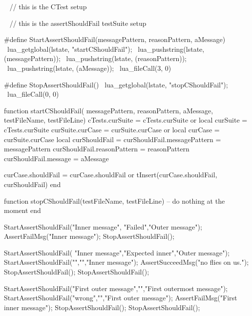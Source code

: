 \CTestsSetup\
\startCTest
  // this is the CTest setup
\stopCTest


\CTestSuiteSetup\
\startCTest
  // this is the assertShouldFail testSuite setup
\stopCTest

\startCHeader
#define StartAssertShouldFail(messagePattern, reasonPattern, aMessage) \
  lua_getglobal(lstate, "startCShouldFail");                           \
  lua_pushstring(lstate, (messagePattern));                            \
  lua_pushstring(lstate, (reasonPattern));                             \
  lua_pushstring(lstate, (aMessage));                                  \
  lua_fileCall(3, 0)

#define StopAssertShouldFail()              \
  lua_getglobal(lstate, "stopCShouldFail"); \
  lua_fileCall(0, 0)
\stopCHeader

\startLuaCode
function startCShouldFail(
  messagePattern, reasonPattern, aMessage,
  testFileName, testFileLine)
  cTests.curSuite    = cTests.curSuite or { }
  local curSuite     = cTests.curSuite
  curSuite.curCase   = curSuite.curCase or { }
  local curCase      = curSuite.curCase
  local curShouldFail   = { }
  curShouldFail.messagePattern = messagePattern
  curShouldFail.reasonPattern  = reasonPattern
  curShouldFail.message        = aMessage
  
  curCase.shouldFail = curCase.shouldFail or { }
  tInsert(curCase.shouldFail, curShouldFail)
end

function stopCShouldFail(testFileName, testFileLine)
  -- do nothing at the moment
end
\stopLuaCode


\startCTest
StartAssertShouldFail("Inner message", "Failed","Outer message");
  AssertFailMsg("Inner message");
StopAssertShouldFail();
\stopCTest
\stopTestCase


\startCTest
StartAssertShouldFail(
  "Inner message","Expected inner","Outer message");
  StartAssertShouldFail("","","Inner message");
    AssertSucceedMsg("no flies on us.");
  StopAssertShouldFail();
StopAssertShouldFail();
\stopCTest
\stopTestCase


\startCTest
StartAssertShouldFail("First outer message","","First outermost message");
StartAssertShouldFail("wrong","","First outer message");
  AssertFailMsg("First inner message");
StopAssertShouldFail();
StopAssertShouldFail();

